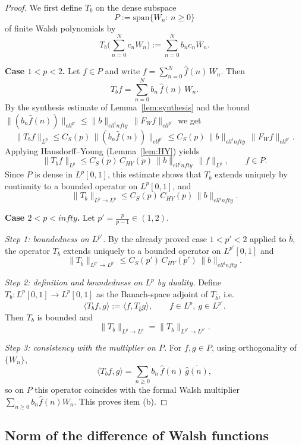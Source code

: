 \documentclass[a4paper,12pt]{article}
\theoremstyle{definition}
\theoremstyle{remark}
\theoremstyle{definition}
\newcommand{\F}{\mathcal{F}_W}
\def\infty{infty}%
\def\ell{ell}%
\def\mathcal#1{#1}%
\begin{document}
\begin{proof}
We first define $T_b$ on the dense subspace
\[
\mathcal P:=\mathrm{span}\{W_n:\,n\ge0\}
\]
of finite Walsh polynomials by
\[
T_b\Big(\sum_{n=0}^N c_n W_n\Big):=\sum_{n=0}^N b_n c_n W_n.
\]

\smallskip
\textbf{Case $1<p<2$.}
Let $f\in\mathcal P$ and write $f=\sum_{n=0}^N \hat f(n)\,W_n$.
Then
\[
T_b f=\sum_{n=0}^N b_n\,\hat f(n)\,W_n.
\]
By the synthesis estimate of Lemma~\ref{lem:synthesis} and the bound
$\|(b_n\hat f(n))\|_{\ell^{p'}}\le \|b\|_{\ell^\infty}\,\|\F f\|_{\ell^{p'}}$ we get
\[
\|T_b f\|_{L^p}
\le C_S(p)\,\|(b_n\hat f(n))\|_{\ell^{p'}}
\le C_S(p)\,\|b\|_{\ell^\infty}\,\|\F f\|_{\ell^{p'}}.
\]
Applying Hausdorff--Young (Lemma~\ref{lem:HY}) yields
\[
\|T_b f\|_{L^p}\le C_S(p)\,C_{HY}(p)\,\|b\|_{\ell^\infty}\,\|f\|_{L^p},
\qquad f\in\mathcal P.
\]
Since $\mathcal P$ is dense in $L^p[0,1]$, this estimate shows that $T_b$
extends uniquely by continuity to a bounded operator on $L^p[0,1]$, and
\[
\|T_b\|_{L^p\to L^p}\le C_S(p)\,C_{HY}(p)\,\|b\|_{\ell^\infty}.
\]

\smallskip
\textbf{Case $2<p<\infty$.}
Let $p'=\frac{p}{p-1}\in(1,2)$.

\emph{Step 1: boundedness on $L^{p'}$.}
By the already proved case $1<p'<2$ applied to $\overline b$, the operator
$T_{\overline b}$ extends uniquely to a bounded operator on $L^{p'}[0,1]$ and
\[
\|T_{\overline b}\|_{L^{p'}\to L^{p'}}
\le C_S(p')\,C_{HY}(p')\,\|b\|_{\ell^\infty}.
\]

\emph{Step 2: definition and boundedness on $L^{p}$ by duality.}
Define $T_b:L^p[0,1]\to L^p[0,1]$ as the Banach-space adjoint of
$T_{\overline b}$, i.e.
\[
\langle T_b f, g\rangle := \langle f, T_{\overline b} g\rangle,
\qquad f\in L^p,\ g\in L^{p'}.
\]
Then $T_b$ is bounded and
\[
\|T_b\|_{L^p\to L^p}=\|T_{\overline b}\|_{L^{p'}\to L^{p'}}.
\]

\emph{Step 3: consistency with the multiplier on $\mathcal P$.}
For $f,g\in\mathcal P$, using orthogonality of $\{W_n\}$,
\[
\langle T_b f, g\rangle
=\sum_{n\ge0} b_n\,\hat f(n)\,\overline{\hat g(n)},
\]
so on $\mathcal P$ this operator coincides with the formal Walsh multiplier
$\sum_{n\ge0} b_n\hat f(n)W_n$. This proves item \textup{(b)}.

\end{proof}

\subsection{Norm of the difference of Walsh functions}
\label{subsec:normdiff}
\end{document}
